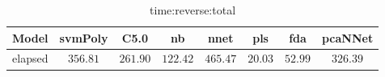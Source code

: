 \begin{table}[!ht]
	\centering
	\begin{tabular}{|c|c|c|c|c|c|c|c|}
		\hline
		Model & svmPoly & C5.0 & nb & nnet & pls & fda & pcaNNet \\ \hline
		elapsed & $356.81$ & $261.90$ & $122.42$ & $465.47$ & $20.03$ & $52.99$ & $326.39$ \\ \hline
	\end{tabular}
	\caption{time:reverse:total}
	\label{tab:time:reverse:total}
\end{table}
